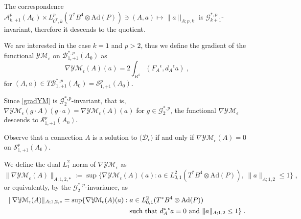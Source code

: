 \documentclass[11pt]{article}
\numberwithin{equation}{section} \setlength{\topmargin}{-35pt}
\newcommand{\Ad}{\text{Ad}}
\newcommand{\YMe}{\mathcal{YM}_{\epsilon}}
\newcommand{\YM}{\mathcal{YM}}
\begin{document}
The correspondence $\mathcal{A}^p_{k,+1}(A_0)\times
L^p_{0^T,k}(T^{\ast}B^4\otimes\Ad(P))\ni (A,a)\mapsto\|a\|_{A;p,k}$
 is $\mathcal{G}^{\ast,p}_{k+1}$-invariant, therefore it descends to the
quotient.

We are interested in the case $k=1$ and $p>2$, thus we define the
gradient of the functional $\YM_{\epsilon}$ on
$\mathcal{B}^{\ast,p}_{1,+1}(A_0)$ as
\begin{equation}
\label{gradYM}
\nabla\YMe(A)(a)=2\int_{B^4}({F_A}^{\epsilon},{d_A}^{\epsilon}a)\;,
\end{equation}
for $(A,a)\in
T\mathcal{B}^{\ast,p}_{1,+1}(A_0)=\mathcal{S}^p_{1,+1}(A_0)$.

Since \eqref{gradYM} is $\mathcal{G}^{\ast,p}_2$-invariant, that is,
$\nabla\YMe(g\cdot A)(g\cdot a)=\nabla\YMe(A)(a)$ for
$g\in\mathcal{G}^{\ast,p}_2$, the functional $\nabla\YMe$ descends
to $\mathcal{S}^p_{1,+1}(A_0)$.

\noindent Observe that a connection $A$ is a solution to
$\bigl(\mathcal{D}_{\epsilon}\bigr)$ if and only if
$\nabla\YMe(A)=0$ on $\mathcal{S}^p_{1,+1}(A_0)$.

We define the dual $L^2_1$-norm of $\nabla\YMe$ as
$$\|\nabla\YMe(A)\|_{A;1,2,\ast}:=\sup\{\nabla\YMe(A)(a):a\in L^2_{0,1}(T^{\ast}B^4\otimes\Ad(P)),~\|a\|_{A;1,2}\le 1\}\;,$$
or equivalently, by the $\mathcal{G}^{\ast,p}_2$-invariance, as
\begin{align}
\label{normgradYM}
\|\nabla\YMe(A)\|_{A;1,2,\ast}=\sup\{\nabla\YMe(A)(a):\;&a\in L^2_{0,1}(T^{\ast}B^4\otimes\Ad(P))\notag\\
&\text{such that ${d_A^{\ast}}^{\epsilon}a=0$ and $\|a\|_{A;1,2}\le
1$}\}\;.
\end{align}
\end{document}
